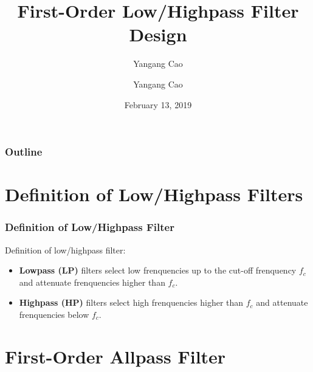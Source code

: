 \documentclass[10pt,a4paper,oneside]{beamer}
\author{Yangang Cao}
\author{Yangang Cao}
\title{First-Order Low/Highpass Filter Design}
\date{February 13, 2019}
\begin{document}
	
	\frame[plain]{\titlepage}
	
	\begin{frame}
	\frametitle{Outline}
	\tableofcontents
\end{frame}

\section{Definition of Low/Highpass Filters}


\begin{frame}
\frametitle{Definition of Low/Highpass Filter}
\vspace{1.5cm}
 Definition of low/highpass filter:
\vspace{0.3cm}
\begin{itemize}
	\item {\bfseries Lowpass (LP)} filters select low frenquencies up to the cut-off frenquency $f_c$ and attenuate frenquencies higher than $f_c$.
	\item {\bfseries Highpass (HP)} filters select high frenquencies higher than $f_c$ and attenuate frenquencies below $f_c$.
	
\end{itemize}


\end{frame}

\section{First-Order Allpass Filter}

\end{document}
